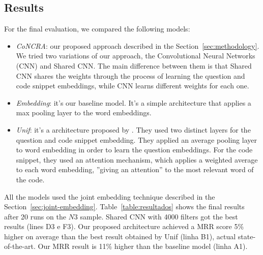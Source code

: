 \documentclass[sigconf]{acmart}
\begin{document}
\subsection{Results}

For the final evaluation, we compared the following models:

\begin{itemize}
    \item \emph{CoNCRA}: our proposed approach described in the Section~\ref{sec:methodology}. We tried two variations of our approach, the Convolutional Neural Networks (CNN) and Shared CNN. The main difference between them is that Shared CNN shares the weights through the process of learning the question and code snippet embeddings, while CNN learns different weights for each one.
    \item \emph{Embedding}: it's our baseline model. It's a simple architecture that applies a max pooling layer to the word embeddings. 
    \item \emph{Unif}: it's a architecture proposed by \cite{cambronero-deep-code-search-2019}. They used two distinct layers for the question and code snippet embedding. They applied an average pooling layer to word embedding in order to learn the question embeddings. For the code snippet, they used an attention mechanism, which applies a weighted average to each word embedding, ''giving an attention'' to the most relevant word of the code.
\end{itemize}

All the models used the joint embedding technique described in the Section~\ref{sec:joint-embedding}. Table~\ref{table:resultados} shows the final results after 20 runs on the $N3$ sample. Shared CNN with 4000 filters got the best results (lines D3 e F3). Our proposed architecture achieved a MRR score 5\% higher on average than the best result obtained by Unif (linha B1), actual state-of-the-art. Our MRR result is 11\% higher than the baseline model (linha A1). 
\end{document}
